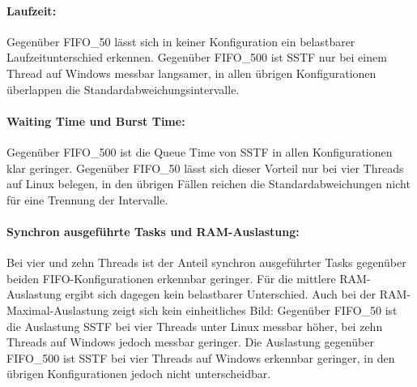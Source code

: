 \begin{sloppypar}
\paragraph{Laufzeit:}
Gegenüber \acs{FIFO}\_50 lässt sich in keiner Konfiguration ein belastbarer Laufzeitunterschied erkennen. Gegenüber \acs{FIFO}\_500 ist \acs{SSTF} nur bei einem Thread auf Windows messbar langsamer, in allen übrigen Konfigurationen überlappen die Standardabweichungsintervalle.

\paragraph{Waiting Time und Burst Time:}
Gegenüber \acs{FIFO}\_500 ist die Queue Time von \acs{SSTF} in allen Konfigurationen klar geringer. Gegenüber \acs{FIFO}\_50 lässt sich dieser Vorteil nur bei vier Threads auf Linux belegen, in den übrigen Fällen reichen die Standardabweichungen nicht für eine Trennung der Intervalle.

\paragraph{Synchron ausgeführte Tasks und \acs{RAM}-Auslastung:}
Bei vier und zehn Threads ist der Anteil synchron ausgeführter Tasks gegenüber beiden \acs{FIFO}-Konfigurationen erkennbar geringer. 
Für die mittlere \acs{RAM}-Auslastung ergibt sich dagegen kein belastbarer Unterschied. Auch bei der \acs{RAM}-Maximal-Auslastung 
zeigt sich kein einheitliches Bild: Gegenüber \acs{FIFO}\_50 ist die Auslastung \acs{SSTF} bei vier Threads unter Linux messbar höher, 
bei zehn Threads auf Windows jedoch messbar geringer. Die Auslastung gegenüber \acs{FIFO}\_500 ist \acs{SSTF} bei vier Threads auf Windows erkennbar geringer, 
in den übrigen Konfigurationen jedoch nicht unterscheidbar.


\end{sloppypar}
